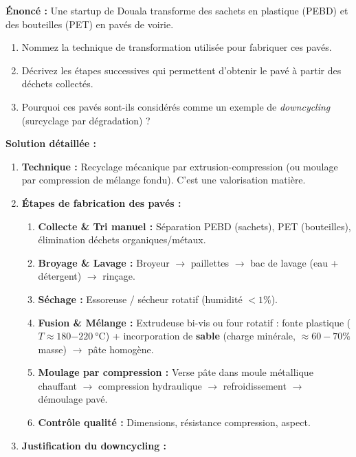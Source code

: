 \documentclass[11pt]{article}
\newcommand{\cle}[1]{{\popxbold\color{popdark}#1}}
\begin{document}
\begin{exoresolu}
\textbf{Énoncé :} Une startup de Douala transforme des sachets en plastique (PEBD) et des bouteilles (PET) en pavés de voirie.
\begin{enumerate}
    \item Nommez la technique de transformation utilisée pour fabriquer ces pavés.
    \item Décrivez les étapes successives qui permettent d'obtenir le pavé à partir des déchets collectés.
    \item Pourquoi ces pavés sont-ils considérés comme un exemple de \emph{downcycling} (surcyclage par dégradation) ?
\end{enumerate}

\tcblower

\textbf{Solution détaillée :}
\begin{enumerate}
    \item \textbf{Technique :} \cle{Recyclage mécanique par extrusion-compression} (ou moulage par compression de mélange fondu). C'est une valorisation matière.
    \item \textbf{Étapes de fabrication des pavés :}
    \begin{enumerate}
        \item \textbf{Collecte \& Tri manuel :} Séparation PEBD (sachets), PET (bouteilles), élimination déchets organiques/métaux.
        \item \textbf{Broyage \& Lavage :} Broyeur $\rightarrow$ paillettes $\rightarrow$ bac de lavage (eau + détergent) $\rightarrow$ rinçage.
        \item \textbf{Séchage :} Essoreuse / sécheur rotatif (humidité $< 1\%$).
        \item \textbf{Fusion \& Mélange :} Extrudeuse bi-vis ou four rotatif : fonte plastique ($T \approx \SI{180-220}{\celsius}$) + incorporation de \textbf{sable} (charge minérale, $\approx 60-70\%$ masse) $\rightarrow$ pâte homogène.
        \item \textbf{Moulage par compression :} Verse pâte dans moule métallique chauffant $\rightarrow$ compression hydraulique $\rightarrow$ refroidissement $\rightarrow$ démoulage pavé.
        \item \textbf{Contrôle qualité :} Dimensions, résistance compression, aspect.
    \end{enumerate}
    \item \textbf{Justification du downcycling :}
    \begin{itemize}

\end{itemize}
\end{enumerate}
\end{exoresolu}
\end{document}

